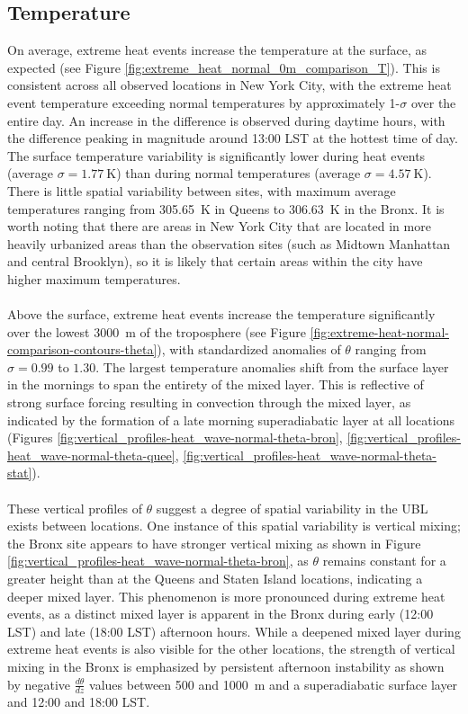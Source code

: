 \documentclass[num-refs]{wiley-article}
\begin{document}
\subsection{Temperature}
On average, extreme heat events increase the temperature at the surface, as expected (see Figure \ref{fig:extreme_heat_normal_0m_comparison_T}). This is consistent across all observed locations in New York City, with the extreme heat event temperature exceeding normal temperatures by approximately 1-$\sigma$ over the entire day. An increase in the difference is observed during daytime hours, with the difference peaking in magnitude around 13:00 LST at the hottest time of day. The surface temperature variability is significantly lower during heat events (average $ \sigma = \SI{1.77}{\kelvin} $) than during normal temperatures (average $ \sigma = \SI{4.57}{\kelvin} $). There is little spatial variability between sites, with maximum average temperatures ranging from \SI{305.65}{\kelvin} in Queens to \SI{306.63}{\kelvin} in the Bronx. It is worth noting that there are areas in New York City that are located in more heavily urbanized areas than the observation sites (such as Midtown Manhattan and central Brooklyn), so it is likely that certain areas within the city have higher maximum temperatures. 
\\ \\
Above the surface, extreme heat events increase the temperature significantly over the lowest \SI{3000}{\meter} of the troposphere (see Figure \ref{fig:extreme-heat-normal-comparison-contours-theta}), with standardized anomalies of $\theta$ ranging from $\sigma = 0.99$ to $1.30$. The largest temperature anomalies shift from the surface layer in the mornings to span the entirety of the mixed layer. This is reflective of strong surface forcing resulting in convection through the mixed layer, as indicated by the formation of a late morning superadiabatic layer at all locations (Figures \ref{fig:vertical_profiles-heat_wave-normal-theta-bron}, \ref{fig:vertical_profiles-heat_wave-normal-theta-quee}, \ref{fig:vertical_profiles-heat_wave-normal-theta-stat}). 
\\ \\
These vertical profiles of $\theta$ suggest a degree of spatial variability in the UBL exists between locations. One instance of this spatial variability is vertical mixing; the Bronx site appears to have stronger vertical mixing as shown in Figure \ref{fig:vertical_profiles-heat_wave-normal-theta-bron}, as $\theta$ remains constant for a greater height than at the Queens and Staten Island locations, indicating a deeper mixed layer. This phenomenon is more pronounced during extreme heat events, as a distinct mixed layer is apparent in the Bronx during early (12:00 LST) and late (18:00 LST) afternoon hours. While a deepened mixed layer during extreme heat events is also visible for the other locations, the strength of vertical mixing in the Bronx is emphasized by persistent afternoon instability as shown by negative $\frac{d\theta}{dz}$ values between 500 and \SI{1000}{\meter} and a superadiabatic surface layer and 12:00 and 18:00 LST.
\end{document}
